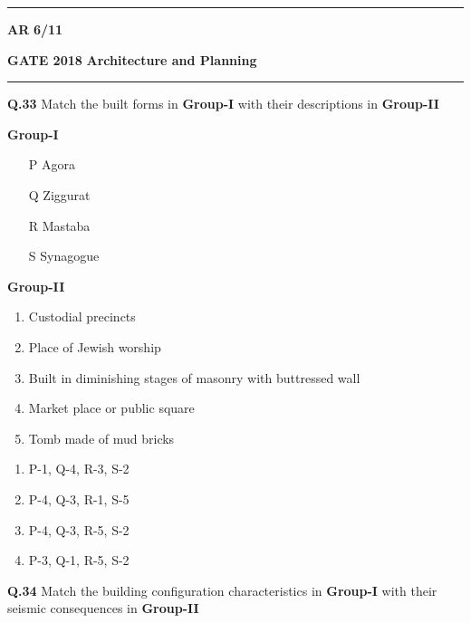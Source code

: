 \documentclass[journal,12pt,onecolumn]{IEEEtran}
\theoremstyle{remark}
\begin{document}
\vspace{2cm}

 \noindent
\hrule \vspace{0.0875CM} \textbf{AR} \hfill  \textbf{6/11}

\newpage

\noindent
\textbf{GATE 2018} \hfill \textbf{Architecture and Planning}
\vspace{0.0012cm} \hrule

\vspace{0.5cm}

\noindent\textbf{Q.33} Match the built forms in \textbf{Group-I} with their descriptions in \textbf{Group-II}

\begin{multicols}{2}
\noindent \hspace{1.5cm}  \textbf  {Group-I}
\begin{enumerate}[label=\Alph*., leftmargin=1.5cm]
    \item[P] Agora
    \item[Q] Ziggurat
    \item[R] Mastaba
    \item[S] Synagogue
\end{enumerate}

\columnbreak

\noindent \hspace{1cm} \textbf{Group-II}
\begin{enumerate}[label=\arabic*., leftmargin=1.5cm]
    \item Custodial precincts
    \item Place of Jewish worship
    \item Built in diminishing stages of masonry with buttressed wall
    \item Market place or public square
    \item Tomb made of mud bricks
\end{enumerate}
\end{multicols}
\vspace{0.15cm}
\begin{multicols}{2}
\begin{enumerate}[label= (\Alph*), leftmargin=1.5cm] 
    \item P-1, Q-4, R-3, S-2
    \item P-4, Q-3, R-1, S-5
    \item P-4, Q-3, R-5, S-2
    \item P-3, Q-1, R-5, S-2
\end{enumerate}
\end{multicols}
\vspace{0.15cm}
\noindent\textbf{Q.34} Match the building configuration characteristics in \textbf{Group-I} with their seismic consequences in \textbf{Group-II}
\end{document}
